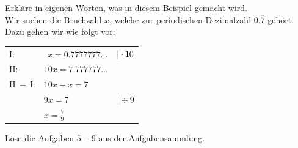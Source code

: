 \documentclass[11pt,oneside]{article}
\begin{document}
    \begin{beispiel}
        Erkläre in eigenen Worten, was in diesem Beispiel gemacht wird.\\
        Wir suchen die Bruchzahl $x$, welche zur periodischen Dezimalzahl $0.\overline{7}$ gehört. Dazu gehen wir wie folgt vor:
        \begin{table}[H]
            \centering
            \begin{tabular}{p{1.5cm} p{3cm} c}
                I: & $\:\:x=0.7777777\ldots$ & $\vert\cdot10$\\
                II: & $10x=7.777777\ldots$ & \\\hline
                II$\:-\:$I: & $10x-x=7$ & \\
                & \hspace{24pt}$9x=7$ & $\vert\div 9$\\
                & \hspace{28pt}$\displaystyle x=\frac{7}{9}$ &
            \end{tabular}
        \end{table}
    \end{beispiel}
    \begin{aufgabe}
        Löse die Aufgaben $5-9$ aus der Aufgabensammlung.
    \end{aufgabe}\newpage
\end{document}
